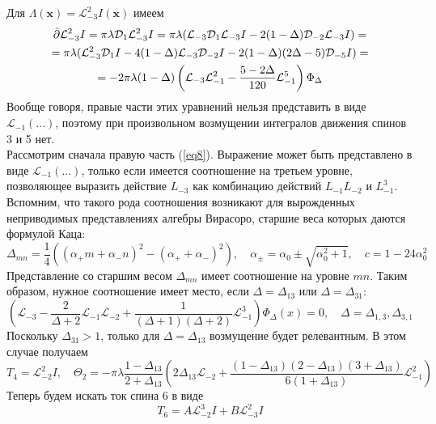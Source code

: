 \documentclass[12pt]{article}
\theoremstyle{definition}
\begin{document}
Для $\Lambda(\bm{x})=\mathcal{L}_{-3}^2I(\bm{x})$ имеем
\begin{multline}
    \Bar{\partial}\mathcal{L}_{-3}^2I=\pi\lambda\mathcal{D}_1\mathcal{L}^2_{-3}I=\pi\lambda(\mathcal{L}_{-3}\mathcal{D}_1\mathcal{L}_{-3}I-2(1-\Delta)\mathcal{D}_{-2}\mathcal{L}_{-3}I)=\\=\pi\lambda(\mathcal{L}^2_{-3}\mathcal{D}_1I-4(1-\Delta)\mathcal{L}_{-3}\mathcal{D}_{-2}I-2(1-\Delta)(2\Delta-5)\mathcal{D}_{-5}I)=\\=-2\pi\lambda(1-\Delta)\left(\mathcal{L}_{-3}\mathcal{L}_{-1}^2-\frac{5-2\Delta}{120}\mathcal{L}_{-1}^5\right)\Phi_\Delta
\end{multline}
Вообще говоря, правые части этих уравнений нельзя представить в виде $\mathcal{L}_{-1}(...)$, поэтому при произвольном возмущении интегралов движения спинов 3 и 5 нет.\\
Рассмотрим сначала правую часть (\ref{eq8}). Выражение может быть представлено в виде $\mathcal{L}_{-1}(...)$,
только если имеется соотношение на третьем уровне, позволяющее выразить действие $L_{-3}$ как комбинацию действий $L_{-1}L_{-2}$ и $L_{-1}^3$. Вспомним, что такого рода соотношения возникают для вырожденных
неприводимых представлениях алгебры Вирасоро, старшие веса которых даются формулой Каца:
\begin{equation}
    \Delta_{mn}=\frac{1}{4}((\alpha_+m+\alpha_-n)^2-(\alpha_++\alpha_-)^2),\quad\alpha_\pm=\alpha_0\pm\sqrt{\alpha_0^2+1},\quad c=1-24\alpha_0^2
\end{equation}
Представление со старшим весом $\Delta_{mn}$ имеет соотношение на уровне $mn$. Таким образом, нужное соотношение имеет место, если $\Delta = \Delta_{13}$ или $\Delta = \Delta_{31}$:
\begin{equation}
    \left(\mathcal{L}_{-3}-\frac{2}{\Delta+2}\mathcal{L}_{-1}\mathcal{L}_{-2}+\frac{1}{(\Delta+1)(\Delta+2)}\mathcal{L}_{-1}^3\right)\Phi_\Delta(x)=0,\quad\Delta=\Delta_{1,3},\Delta_{3,1}
\end{equation}
Поскольку $\Delta_{31} > 1$, только для $\Delta = \Delta_{13}$ возмущение будет релевантным. В этом случае получаем
\begin{equation}
    T_4=\mathcal{L}_{-2}^2I,\quad\Theta_2=-\pi\lambda\frac{1-\Delta_{13}}{2+\Delta_{13}}\left(2\Delta_{13}\mathcal{L}_{-2}+\frac{(1-\Delta_{13})(2-\Delta_{13})(3+\Delta_{13})}{6(1+\Delta_{13})}\mathcal{L}_{-1}^2\right)
\end{equation}
Теперь будем искать ток спина 6 в виде
\begin{equation}
    T_6=A\mathcal{L}_{-2}^3I+B\mathcal{L}_{-3}^2I
\end{equation}
\end{document}
